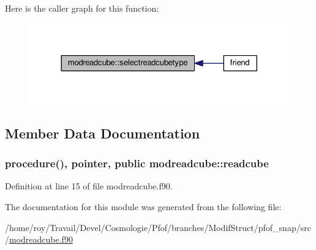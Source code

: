 Here is the caller graph for this function\-:\nopagebreak
\begin{figure}[H]
\begin{center}
\leavevmode
\includegraphics[width=324pt]{classmodreadcube_a4a766e844f098b280fdd9b43f4ba1f08_icgraph}
\end{center}
\end{figure}




\subsection{Member Data Documentation}
\hypertarget{classmodreadcube_a29b15033a5a22b6885adfeec6dc59423}{
\subsubsection[{readcube}]{\setlength{\rightskip}{0pt plus 5cm}procedure(), pointer, public modreadcube\-::readcube}}\label{classmodreadcube_a29b15033a5a22b6885adfeec6dc59423}


Definition at line 15 of file modreadcube.\-f90.



The documentation for this module was generated from the following file\-:\begin{DoxyCompactItemize}
\item 
/home/roy/\-Travail/\-Devel/\-Cosmologie/\-Pfof/branches/\-Modif\-Struct/pfof\-\_\-snap/src/\hyperlink{modreadcube_8f90}{modreadcube.\-f90}\end{DoxyCompactItemize}
